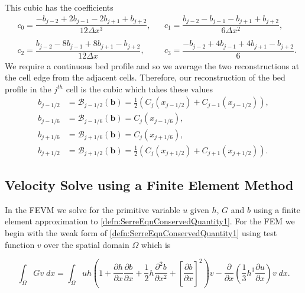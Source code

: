 \documentclass[times]{elsarticle}
\newcommand{\vecn}[1]{\boldsymbol{#1}}
\begin{document}
This cubic has the coefficients
\begin{align*}
&c_0 =  \dfrac{-b_{j-2} + 2b_{j-1} - 2 b_{j+1} + b_{j+2}}{12 \Delta x^3}, & &
c_1 =  \dfrac{b_{j-2} - b_{j-1} - b_{j+1} + b_{j+2}}{6 \Delta x^2},\\ \\
&c_2 =  \dfrac{b_{j-2} - 8b_{j-1} + 8 b_{j+1} - b_{j+2}}{12 \Delta x},& &
c_3 =  \dfrac{-b_{j-2}  + 4b_{j-1} + 4 b_{j+1} - b_{j+2}}{6}.
\end{align*}
We require a continuous bed profile and so we average the two reconstructions at the cell edge from the adjacent cells. Therefore, our reconstruction of the bed profile in the $j^{th}$ cell is the cubic which takes these values
\begin{subequations}
	\begin{align}
	b_{j-1/2} &=  \mathcal{B}_{j-1/2}\left(\vecn{b}\right) =  \frac{1}{2}\left( C_j(x_{j-1/2}) + C_{j-1}(x_{j-1/2})\right),\\
	b_{j-1/6} &=  \mathcal{B}_{j-1/6}\left(\vecn{b}\right) =  C_j(x_{j-1/6}),\\
	b_{j+1/6} &=  \mathcal{B}_{j+1/6}\left(\vecn{b}\right) =  C_j(x_{j+1/6}),\\
	b_{j+1/2} &=  \mathcal{B}_{j+1/2}\left(\vecn{b}\right) =  \frac{1}{2}\left( C_j(x_{j+1/2}) + C_{j+1}(x_{j+1/2})\right).
	\end{align}
	\label{eqn:BedReconDef}
\end{subequations}

\subsection{Velocity Solve using a Finite Element Method}
In the FEVM we solve for the primitive variable $u$ given $h$, $G$ and $b$ using a finite element approximation to \eqref{defn:SerreEqnConservedQuantity1}. For the FEM we begin with the weak form of \eqref{defn:SerreEqnConservedQuantity1} using test function $v$ over the spatial domain $\Omega$ which is 

\begin{equation*}
\int_{\Omega } G v \; dx =  \int_{\Omega } uh \left(1 + \frac{\partial h}{\partial x}\frac{\partial b}{\partial x} + \frac{1}{2}h\frac{\partial^2 b}{\partial x^2} +  \left[\frac{\partial b}{\partial x}\right]^2 \right) v - \frac{\partial}{\partial x}\left(\frac{1}{3}h^3  \frac{\partial {u}}{\partial x}\right) v \; dx.
\end{equation*}
\end{document}

